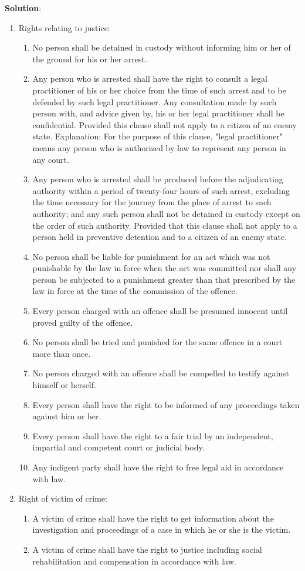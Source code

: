 \documentclass[
  openany]{book}
\newenvironment{solution}{ {\bfseries Solution}:}{}
\begin{document}
\begin{questions}
\begin{solution}
\begin{enumerate}
\item Rights relating to justice:
\begin{enumerate}
\item No person shall be detained in custody without informing him or her of the ground for his or her arrest.
\item Any person who is arrested shall have the right to consult a legal practitioner of his or her choice from the time of such arrest and to be defended by such legal practitioner. Any consultation made by such person with, and advice given by, his or her legal practitioner shall be confidential. Provided this clause shall not apply to a citizen of an enemy state. Explanation: For the purpose of this clause, "legal practitioner" means any person who is authorized by law to represent any person in any court.
\item Any person who is arrested shall be produced before the adjudicating authority within a period of twenty-four hours of such arrest, excluding the time necessary for the journey from the place of arrest to such authority; and any such person shall not be detained in custody except on the order of such authority. Provided that this clause shall not apply to a person held in preventive detention and to a citizen of an enemy state.
\item No person shall be liable for punishment for an act which was not punishable by the law in force when the act was committed nor shall any person be subjected to a punishment greater than that prescribed by the law in force at the time of the commission of the offence.
\item Every person charged with an offence shall be presumed innocent until proved guilty of the offence.
\item No person shall be tried and punished for the same offence in a court more than once.
\item No person charged with an offence shall be compelled to testify against himself or herself.
\item Every person shall have the right to be informed of any proceedings taken against him or her.
\item Every person shall have the right to a fair trial by an independent, impartial and competent court or judicial body.
\item Any indigent party shall have the right to free legal aid in accordance with law.
\end{enumerate}

\item Right of victim of crime:
\begin{enumerate}
\item A victim of crime shall have the right to get information about the investigation and proceedings of a case in which he or she is the victim.
\item A victim of crime shall have the right to justice including social rehabilitation and compensation in accordance with law.
\end{enumerate}


\end{enumerate}
\end{solution}
\end{questions}
\end{document}
